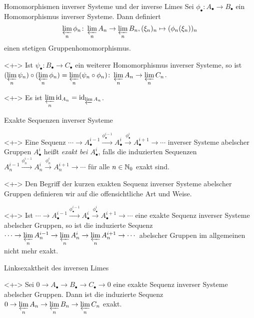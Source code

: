 \begin{frame}{Homomorphismen inverser Systeme und der inverse Limes}
	Sei \(\phi_\bullet\colon A_\bullet \to B_\bullet\) ein Homomorphismus inverser Systeme. Dann definiert
	\[
		\varprojlim\limits_n \phi_n\colon \varprojlim\limits_n A_n \to \varprojlim\limits_n B_n,
		(\xi_n)_n \mapsto (\phi_n(\xi_n))_n
	\]
	einen stetigen Gruppenhomomorphismus.
	\begin{example}<+->
		Ist \(\psi_\bullet\colon B_\bullet \to C_\bullet\) ein weiterer Homomorphismus inverser Systeme,
		so ist
		\((\varprojlim\limits_n \psi_n) \circ (\varprojlim\limits_n \phi_n) = \varprojlim\limits_n (\psi_n \circ \phi_n)\colon
		\varprojlim\limits_n A_n \to \varprojlim\limits_n C_n\).
	\end{example}
	\begin{example}<+->
		Es ist \(\varprojlim\limits_n \operatorname{id}_{A_n} = \operatorname{id}_{\varprojlim\limits A_n}\).
	\end{example}
\end{frame}

\begin{frame}{Exakte Sequenzen inverser Systeme}
	\begin{definition}<+->
		Eine Sequenz \(\dotsb \to A_\bullet^{i - 1} \xrightarrow{\phi_\bullet^{i - 1}} A_\bullet^i \xrightarrow{\phi_\bullet^i}
		A_\bullet^{i + 1} \to \dotsb\) inverser Systeme abelscher Gruppen \(A_\bullet^i\)
		heißt \emph{exakt bei \(A_\bullet^i\)},
		falls die induzierten Sequenzen \(A_n^{i - 1} \xrightarrow{\phi_n^{i - 1}} A_n^i \xrightarrow{\phi_n^i} A_n^{i + 1} \to \dotsb\)
		für alle \(n \in \mathbb N_0\) exakt sind.
	\end{definition}
	\begin{visibleenv}<+->
		Den Begriff der kurzen exakten Sequenz inverser Systeme abelscher Gruppen definieren wir auf die offensichtliche Art
		und Weise.
	\end{visibleenv}
	\begin{remark}<+->
		Ist \(\dotsb \to A_\bullet^{i - 1} \xrightarrow{\phi_\bullet^{i - 1}} A_\bullet^i \xrightarrow{\phi_\bullet^i}
		A_\bullet^{i + 1} \to \dotsb\) eine exakte Sequenz inverser Systeme abelscher Gruppen, so ist die
		induzierte Sequenz
		\(\dotsb \to \varprojlim\limits_n A_n^{i - 1} \to \varprojlim\limits_n A_n^i \to \varprojlim\limits_n A_n^{i + 1} \to \dotsb\)
		abelscher Gruppen im allgemeinen nicht mehr exakt.
	\end{remark}
\end{frame}

\begin{frame}{Linksexaktheit des inversen Limes}
	\begin{proposition}<+->
		Sei \(0 \to A_\bullet \to B_\bullet \to C_\bullet \to 0\) eine exakte Sequenz inverser Systeme abelscher Gruppen. Dann
		ist die induzierte Sequenz \(0 \to \varprojlim\limits_n A_n \to \varprojlim\limits_n B_n \to \varprojlim\limits_n C_n\)
		exakt.
	\end{proposition}
\end{frame}

